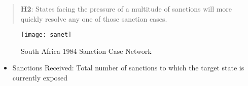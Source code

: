 
\begin{quote}
	\textbf{H2}: States facing the pressure of a multitude of sanctions will more quickly resolve any one of those sanction cases.
\end{quote}

\begin{figure}[ht]
	\centering
	\texttt{[image: sanet]}
	\caption{South Africa 1984 Sanction Case Network}
	\label{fig:sanet}
\end{figure}
\FloatBarrier

	\begin{itemize}
		\item Sanctions Received: Total number of sanctions to which the target state is currently exposed
	\end{itemize}





